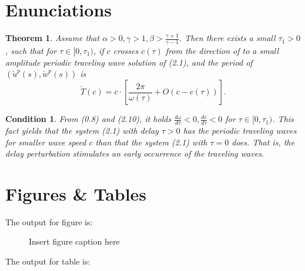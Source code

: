 \documentclass[openacc]{rsproca_new}%
\newtheorem{theorem}{\bf Theorem}[section]
\newtheorem{condition}{\bf Condition}[section]
\begin{document}

\maketitle

\section{Enunciations}

\begin{theorem}\label{T0.1}
Assume that $\alpha>0, \gamma>1, \beta>\frac{\gamma+1}{\gamma-1}$.
Then there exists a small $\tau_1>0$, such that for $\tau\in
[0,\tau_1)$, if $c$ crosses $c(\tau)$ from the direction of
to  a small amplitude periodic traveling wave solution of
(2.1), and the period of $(\check{u}^p(s),\check{w}^p(s))$ is
\[
\check{T}(c)=c\cdot \left[\frac{2\pi}{\omega(\tau)}+O(c-c(\tau))\right].
\]
\end{theorem}


\begin{condition}\label{C2.2}
From (0.8) and (2.10), it holds
$\frac{d\omega}{d\tau}<0,\frac{dc}{d\tau}<0$ for $\tau\in
[0,\tau_1)$. This fact yields that the system (2.1) with delay
$\tau>0$ has the periodic traveling waves for smaller wave speed $c$
than that the system (2.1) with $\tau=0$ does. That is, the
delay perturbation stimulates an early occurrence of the traveling waves.
\end{condition}


\section{Figures \& Tables}

The output for figure is:\vspace*{-7pt}

\begin{figure}[!h]
\caption{Insert figure caption here}
\label{fig_sim}
\end{figure}

\vspace*{-5pt}

\noindent The output for table is:\vspace*{-7pt}
\end{document}
